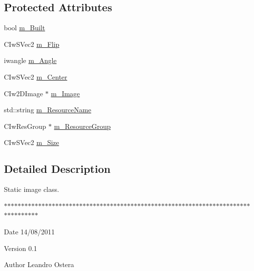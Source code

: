 \subsection*{Protected Attributes}
\begin{DoxyCompactItemize}
\item 
bool \hyperlink{class_ty_image_a314c8e3b0c05ad97c8c8bb7cc39b5ea6}{m\_\-Built}
\item 
CIwSVec2 \hyperlink{class_ty_image_acf79c8bc250ac9f0c630d8cc77376284}{m\_\-Flip}
\item 
iwangle \hyperlink{class_ty_image_a61002e26997486e47f8fd35aae194ddb}{m\_\-Angle}
\item 
CIwSVec2 \hyperlink{class_ty_image_a99aad782345362b97874eb63331aade0}{m\_\-Center}
\item 
CIw2DImage $\ast$ \hyperlink{class_ty_image_ae087e8e0af860b1b8e0df36fe28b591f}{m\_\-Image}
\item 
std::string \hyperlink{class_ty_image_aabd5f1076f03127120cfbe3360331b0c}{m\_\-ResourceName}
\item 
CIwResGroup $\ast$ \hyperlink{class_ty_image_a4b278a1be30ad7f5abc47f008bbbdfc4}{m\_\-ResourceGroup}
\item 
CIwSVec2 \hyperlink{class_ty_image_a1a2f362a92fb810372f9d4caedaf9f3f}{m\_\-Size}
\end{DoxyCompactItemize}


\subsection{Detailed Description}
Static image class. 

$\ast$$\ast$$\ast$$\ast$$\ast$$\ast$$\ast$$\ast$$\ast$$\ast$$\ast$$\ast$$\ast$$\ast$$\ast$$\ast$$\ast$$\ast$$\ast$$\ast$$\ast$$\ast$$\ast$$\ast$$\ast$$\ast$$\ast$$\ast$$\ast$$\ast$$\ast$$\ast$$\ast$$\ast$$\ast$$\ast$$\ast$$\ast$$\ast$$\ast$$\ast$$\ast$$\ast$$\ast$$\ast$$\ast$$\ast$$\ast$$\ast$$\ast$$\ast$$\ast$$\ast$$\ast$$\ast$$\ast$$\ast$$\ast$$\ast$$\ast$$\ast$$\ast$$\ast$$\ast$$\ast$$\ast$$\ast$$\ast$$\ast$$\ast$$\ast$$\ast$$\ast$$\ast$$\ast$$\ast$$\ast$$\ast$$\ast$$\ast$$\ast$$\ast$

\begin{DoxyDate}{Date}
14/08/2011 
\end{DoxyDate}
\begin{DoxyVersion}{Version}
0.1 
\end{DoxyVersion}
\begin{DoxyAuthor}{Author}
Leandro Ostera 
\end{DoxyAuthor}


